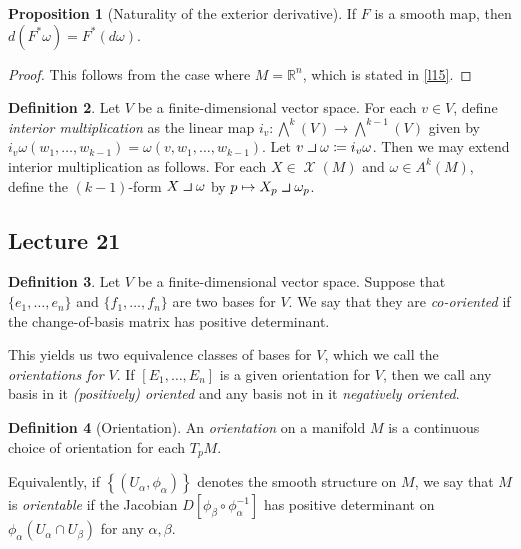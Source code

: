 \documentclass[10pt,letterpaper,cm]{nupset}
\theoremstyle{definition}
\newtheorem{definition}{Definition}[subsection]
\theoremstyle{theorem}
\newtheorem{prop}[definition]{Proposition}
\theoremstyle{remark}
\newcommand{\R}{\mathbb R}
\newcommand{\1}{\mathbf{1}}
\newcommand{\0}{\vec 0}
\newcommand{\intprodl}{%
    \mathbin{\scalebox{1.5}{$\lrcorner$}}%
}
\DeclareMathOperator{\vf}{\mathscr{X}}
\begin{document}
\begin{prop}[Naturality of the exterior derivative]\label{natural}
If $F$ is a smooth map, then $d(F^{\ast} \omega) = F^{\ast}(d \omega).$
\end{prop}
\begin{proof}
This follows from the case where $M = \R^n$, which is stated in \cref{l15}.
\end{proof}

\begin{definition}
Let $V$ be a finite-dimensional vector space. For each $v\in V$, define \textit{interior multiplication} as the linear map $i_v: \bigwedge^k(V) \to \bigwedge^{k-1}(V)$ given by $i_v \omega(w_1, \ldots, w_{k-1})= \omega(v, w_1, \ldots, w_{k-1}).$ Let $v \intprodl \omega \coloneqq  i_v \omega$. Then we may extend interior multiplication as follows. For each $X \in \vf(M)$ and $\omega \in A^k(M)$, define the $(k-1)$-form $X \intprodl \omega$ by $p\mapsto  X_p \intprodl \omega_p$.
\end{definition}

\subsection{Lecture 21}

\begin{definition}
Let $V$ be a finite-dimensional vector space. Suppose that $\{e_1, \ldots, e_n\}$ and $\{f_1, \ldots, f_n\}$ are two bases for $V$. We say that they are \textit{co-oriented} if the change-of-basis matrix  has positive determinant.
\end{definition}

This yields us two equivalence classes of bases for $V$, which we call the \textit{orientations for $V$}. If $[E_1, \ldots, E_n]$ is a given orientation for $V$, then we call any basis in it \textit{(positively) oriented} and any basis not in it \textit{negatively oriented}.

\begin{definition}[Orientation]
An \textit{orientation} on a manifold $M$ is a continuous choice of orientation for each $T_pM$. 
\end{definition}

Equivalently, if $\left\{(U_{\alpha}, \phi_{\alpha})\right\}$ denotes the smooth structure on $M$, we say that $M$ is \textit{orientable} if the Jacobian $D\left[\phi_{\beta} \circ \phi_{\alpha}^{-1}\right]$ has positive determinant on $\phi_{\alpha}(U_{\alpha}\cap U_{\beta})$ for any $\alpha, \beta$.
\end{document}
